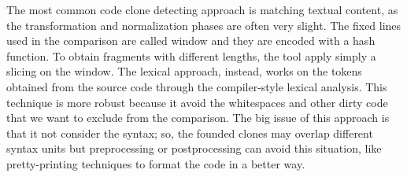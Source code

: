 

The most common code clone detecting approach is matching textual content, as the transformation and normalization phases are often very slight. The fixed lines used in the comparison are called window and they are encoded with a hash function. To obtain fragments with different lengths, the tool apply simply a slicing on the window. The lexical approach, instead, works on the tokens obtained from the source code through the compiler-style lexical analysis. This technique is more robust because it avoid the whitespaces and other dirty code that we want to exclude from the comparison. The big issue of this approach is that it not consider the syntax; so, the founded clones may overlap different syntax units but preprocessing or postprocessing can avoid this situation, like pretty-printing techniques to format the code in a better way.


